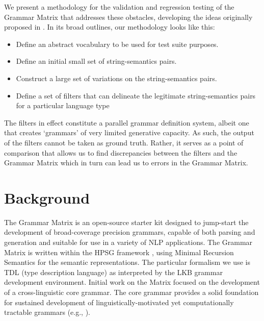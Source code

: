 \documentclass[11pt]{article}
\begin{document}
We present a methodology for the validation and regression testing of
the Grammar Matrix that addresses these obstacles, developing the ideas
originally proposed in \cite{Poul:06}. In its broad
outlines, our methodology looks like this:

\begin{itemize}
\item Define an abstract vocabulary to be used for test suite purposes.
\item Define an initial small set of string-semantics pairs.
\item Construct a large set of variations on the string-semantics pairs.
\item Define a set of filters that can delineate the legitimate string-semantics pairs for a particular language type
\end{itemize}
%
The filters in effect constitute a parallel grammar definition
system, albeit one that creates `grammars' of very limited generative
capacity.  As such, the output of the filters cannot be taken as
ground truth.  Rather, it serves as a point of comparison that allows
us to find discrepancies between the filters and the Grammar Matrix which in turn
can lead us to errors in the Grammar Matrix.

\section{Background}
\label{GM}

The Grammar Matrix is an open-source starter kit designed to
jump-start the development of broad-coverage precision grammars,
capable of both parsing and generation and suitable for use in a
variety of NLP applications.  The Grammar Matrix is written within the
HPSG framework \cite{Pol:Sag:94}, using Minimal
Recursion Semantics \cite{Cop:Fli:Pol:Sag:05} for the semantic
representations. The particular formalism we use is TDL
(type description language) as interpreted by the LKB
\cite{Copestake02} grammar development environment.  Initial work on
the Matrix \cite{Ben:Fli:Oep:02,Fli:Ben:03} focused on the
development of a cross-linguistic core grammar.  The core grammar
provides a solid foundation for sustained development of
linguistically-motivated yet computationally tractable grammars (e.g.,
\cite{Hel:Hau:03,Kor:Neu:05}).  
\end{document}
